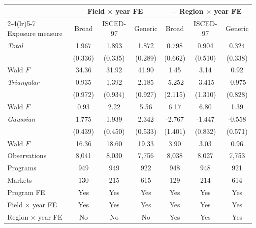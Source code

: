 \begin{tabular}{lcccccc}
\toprule
 & \multicolumn{3}{c}{Field \(\times\) year FE} & \multicolumn{3}{c}{\(+\) Region \(\times\) year FE} \\
\cmidrule(lr){2-4}\cmidrule(lr){5-7}
Exposure measure & Broad & ISCED-97 & Generic & Broad & ISCED-97 & Generic \\
\midrule
\textit{Total} &  1.967\sym{***} &  1.893\sym{***} &  1.872\sym{***} &  0.798 &  0.904\sym{*} &  0.324 \\
 & (0.336) & (0.335) & (0.289) & (0.662) & (0.510) & (0.338) \\
\quad Wald \(F\) & 34.36 & 31.92 & 41.90 &  1.45 &  3.14 &  0.92 \\
\addlinespace
\textit{Triangular} &  0.935 &  1.392 &  2.185\sym{**} & -5.252\sym{**} & -3.415\sym{***} & -0.975 \\
 & (0.972) & (0.934) & (0.927) & (2.115) & (1.310) & (0.828) \\
\quad Wald \(F\) &  0.93 &  2.22 &  5.56 &  6.17 &  6.80 &  1.39 \\
\addlinespace
\textit{Gaussian} &  1.775\sym{***} &  1.939\sym{***} &  2.342\sym{***} & -2.767\sym{*} & -1.447\sym{*} & -0.558 \\
 & (0.439) & (0.450) & (0.533) & (1.401) & (0.832) & (0.571) \\
\quad Wald \(F\) & 16.36 & 18.60 & 19.33 &  3.90 &  3.03 &  0.96 \\
\midrule
Observations &     8,041 &     8,030 &     7,756 &     8,038 &     8,027 &     7,753 \\
Programs &       949 &       949 &       922 &       948 &       948 &       921 \\
Markets &       130 &       215 &       615 &       129 &       214 &       614 \\
Program FE & Yes & Yes & Yes & Yes & Yes & Yes \\
Field \(\times\) year FE & Yes & Yes & Yes & Yes & Yes & Yes \\
Region \(\times\) year FE & No & No & No & Yes & Yes & Yes \\
\bottomrule
\end{tabular}
